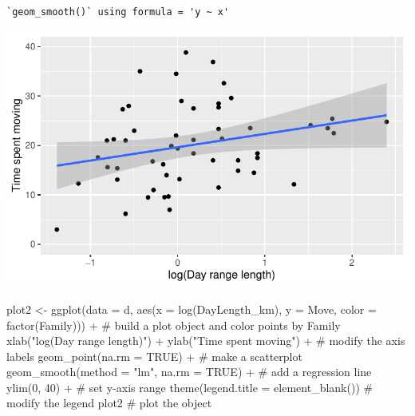 \documentclass[
  letterpaper,
  DIV=11,
  numbers=noendperiod]{scrartcl}
\newenvironment{Shaded}{\begin{snugshade}}{\end{snugshade}}
\newcommand{\AttributeTok}[1]{\textcolor[rgb]{0.40,0.45,0.13}{#1}}
\newcommand{\CommentTok}[1]{\textcolor[rgb]{0.37,0.37,0.37}{#1}}
\newcommand{\ConstantTok}[1]{\textcolor[rgb]{0.56,0.35,0.01}{#1}}
\newcommand{\DecValTok}[1]{\textcolor[rgb]{0.68,0.00,0.00}{#1}}
\newcommand{\FunctionTok}[1]{\textcolor[rgb]{0.28,0.35,0.67}{#1}}
\newcommand{\NormalTok}[1]{\textcolor[rgb]{0.00,0.23,0.31}{#1}}
\newcommand{\OtherTok}[1]{\textcolor[rgb]{0.00,0.23,0.31}{#1}}
\newcommand{\SpecialCharTok}[1]{\textcolor[rgb]{0.37,0.37,0.37}{#1}}
\newcommand{\StringTok}[1]{\textcolor[rgb]{0.13,0.47,0.30}{#1}}
\begin{document}
\begin{verbatim}
`geom_smooth()` using formula = 'y ~ x'
\end{verbatim}

\includegraphics{EDA-challenge_files/figure-pdf/unnamed-chunk-3-1.pdf}

\begin{Shaded}
\begin{Highlighting}[]
\NormalTok{plot2 }\OtherTok{\textless{}{-}} \FunctionTok{ggplot}\NormalTok{(}\AttributeTok{data =}\NormalTok{ d, }
            \FunctionTok{aes}\NormalTok{(}\AttributeTok{x =} \FunctionTok{log}\NormalTok{(DayLength\_km), }
                \AttributeTok{y =}\NormalTok{ Move,}
                \AttributeTok{color =} \FunctionTok{factor}\NormalTok{(Family))) }\SpecialCharTok{+}  \CommentTok{\# build a plot object and color points by Family}
  \FunctionTok{xlab}\NormalTok{(}\StringTok{"log(Day range length)"}\NormalTok{) }\SpecialCharTok{+} \FunctionTok{ylab}\NormalTok{(}\StringTok{"Time spent moving"}\NormalTok{) }\SpecialCharTok{+} \CommentTok{\# modify the axis labels}
  \FunctionTok{geom\_point}\NormalTok{(}\AttributeTok{na.rm =} \ConstantTok{TRUE}\NormalTok{) }\SpecialCharTok{+} \CommentTok{\# make a scatterplot}
  \FunctionTok{geom\_smooth}\NormalTok{(}\AttributeTok{method =} \StringTok{"lm"}\NormalTok{, }\AttributeTok{na.rm =} \ConstantTok{TRUE}\NormalTok{) }\SpecialCharTok{+} \CommentTok{\# add a regression line}
  \FunctionTok{ylim}\NormalTok{(}\DecValTok{0}\NormalTok{, }\DecValTok{40}\NormalTok{) }\SpecialCharTok{+} \CommentTok{\# set y{-}axis range}
  \FunctionTok{theme}\NormalTok{(}\AttributeTok{legend.title =} \FunctionTok{element\_blank}\NormalTok{()) }\CommentTok{\# modify the legend}
\NormalTok{plot2 }\CommentTok{\# plot the object}
\end{Highlighting}
\end{Shaded}
\end{document}
